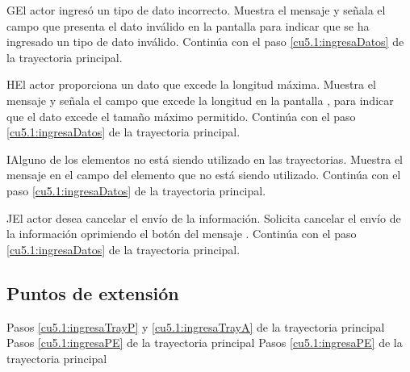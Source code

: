  \begin{UCtrayectoriaA}{G}{El actor ingresó un tipo de dato incorrecto.}
    \UCpaso[\UCsist] Muestra el mensaje  y señala el campo que presenta el dato inválido en la 
    pantalla  para indicar que se ha ingresado un tipo de dato inválido.
    \UCpaso[] Continúa con el paso \ref{cu5.1:ingresaDatos} de la trayectoria principal.
 \end{UCtrayectoriaA}
 \begin{UCtrayectoriaA}{H}{El actor proporciona un dato que excede la longitud máxima.}
    \UCpaso[\UCsist] Muestra el mensaje  y señala el campo que excede la 
    longitud en la pantalla , para indicar que el dato excede el tamaño máximo permitido.
    \UCpaso[] Continúa con el paso \ref{cu5.1:ingresaDatos} de la trayectoria principal.
 \end{UCtrayectoriaA}
 \begin{UCtrayectoriaA}{I}{Alguno de los elementos no está siendo utilizado en las trayectorias.}
    \UCpaso[\UCsist] Muestra el mensaje  en el campo del elemento
    que no está siendo utilizado.
    \UCpaso[] Continúa con el paso \ref{cu5.1:ingresaDatos} de la trayectoria principal.
 \end{UCtrayectoriaA}
 
 \begin{UCtrayectoriaA}{J}{El actor desea cancelar el envío de la información.}
    \UCpaso[\UCactor] Solicita cancelar el envío de la información oprimiendo el botón  del mensaje .
    \UCpaso[] Continúa con el paso \ref{cu5.1:ingresaDatos} de la trayectoria principal.
 \end{UCtrayectoriaA}
 
 

\subsection{Puntos de extensión}
	{Pasos \ref{cu5.1:ingresaTrayP} y \ref{cu5.1:ingresaTrayA} de la trayectoria principal}
	{}
	{Pasos \ref{cu5.1:ingresaPE} de la trayectoria principal}
	{}
	{Pasos \ref{cu5.1:ingresaPE} de la trayectoria principal}
	{}
	

